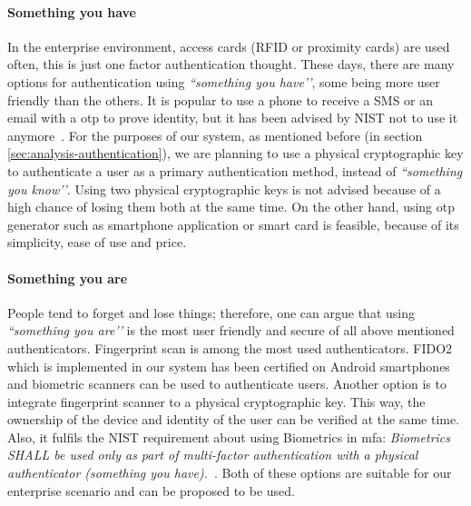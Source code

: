 \paragraph{Something you have}
In the enterprise environment, access cards (RFID or proximity cards) are used often, this is just one factor authentication thought. These days, there are many options for authentication using \textit{``something you have’’}, some being more user friendly than the others. It is popular to use a phone to receive a SMS or an email with a \acrfull{otp} to prove identity, but it has been advised by NIST not to use it anymore~\cite{NIST2017NISTBlog}. For the purposes of our system, as mentioned before (in section \ref{sec:analysis-authentication}), we are planning to use a physical cryptographic key to authenticate a user as a primary authentication method, instead of \textit{``something you know’’}. Using two physical cryptographic keys is not advised because of a high chance of losing them both at the same time. On the other hand, using \acrshort{otp} generator such as smartphone application or smart card is feasible, because of its simplicity, ease of use and price. 

\paragraph{Something you are}
People tend to forget and lose things; therefore, one can argue that using \textit{``something you are’’} is the most user friendly and secure of all above mentioned authenticators. Fingerprint scan is among the most used authenticators. FIDO2 which is implemented in our system has been certified on Android smartphones and biometric scanners can be used to authenticate users. Another option is to integrate fingerprint scanner to a physical cryptographic key. This way, the ownership of the device and identity of the user can be verified at the same time. Also, it fulfils the NIST requirement about using Biometrics in \acrshort{mfa}: \textit{Biometrics SHALL be used only as part of multi-factor authentication with a physical authenticator (something you have).}~\cite{Grassi2017DigitalManagement}. Both of these options are suitable for our enterprise scenario and can be proposed to be used.

